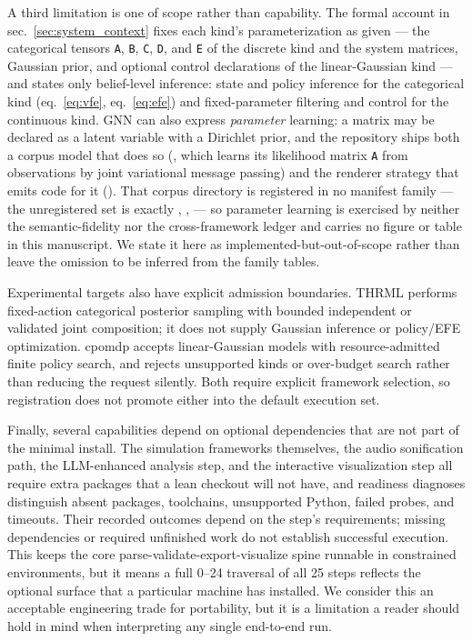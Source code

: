\documentclass[
  english,
  9pt,
]{extarticle}
\begin{document}
A third limitation is one of scope rather than capability. The formal
account in sec.~\ref{sec:system_context} fixes each kind's
parameterization as given --- the categorical tensors \texttt{A},
\texttt{B}, \texttt{C}, \texttt{D}, and \texttt{E} of the discrete kind
and the system matrices, Gaussian prior, and optional control
declarations of the linear-Gaussian kind --- and states only
belief-level inference: state and policy inference for the categorical
kind (eq.~\ref{eq:vfe}, eq.~\ref{eq:efe}) and fixed-parameter filtering
and control for the continuous kind. GNN can also express
\emph{parameter} learning: a matrix may be declared as a latent variable
with a Dirichlet prior, and the repository ships both a corpus model
that does so
(,
which learns its likelihood matrix \texttt{A} from observations by joint
variational message passing) and the renderer strategy that emits code
for it (). That
corpus directory is registered in no manifest family --- the
unregistered set is exactly ,
,  ---
so parameter learning is exercised by neither the semantic-fidelity nor
the cross-framework ledger and carries no figure or table in this
manuscript. We state it here as implemented-but-out-of-scope rather than
leave the omission to be inferred from the family tables.

Experimental targets also have explicit admission boundaries. THRML
performs fixed-action categorical posterior sampling with bounded
independent or validated joint composition; it does not supply Gaussian
inference or policy/EFE optimization. cpomdp accepts linear-Gaussian
models with resource-admitted finite policy search, and rejects
unsupported kinds or over-budget search rather than reducing the request
silently. Both require explicit framework selection, so registration
does not promote either into the default execution set.

Finally, several capabilities depend on optional dependencies that are
not part of the minimal install. The simulation frameworks themselves,
the audio sonification path, the LLM-enhanced analysis step, and the
interactive visualization step all require extra packages that a lean
checkout will not have, and readiness diagnoses distinguish absent
packages, toolchains, unsupported Python, failed probes, and timeouts.
Their recorded outcomes depend on the step's requirements; missing
dependencies or required unfinished work do not establish successful
execution. This keeps the core parse-validate-export-visualize spine
runnable in constrained environments, but it means a full 0--24
traversal of all 25 steps reflects the optional surface that a
particular machine has installed. We consider this an acceptable
engineering trade for portability, but it is a limitation a reader
should hold in mind when interpreting any single end-to-end run.
\end{document}
